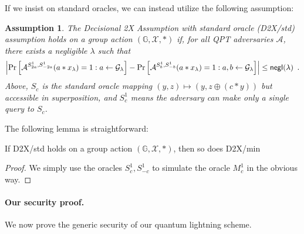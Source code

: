 \documentclass{article}\usepackage[a4paper,margin=20mm]{geometry}
\newtheorem{assumption}[theorem]{Assumption}
\numberwithin{theorem}{section}
\numberwithin{equation}{section}
\newcommand{\G}{\mathbb{G}}
\newcommand{\As}{{\mathcal{A}}}
\newcommand{\Gs}{{\mathcal{G}}}
\newcommand{\Xs}{{\mathcal{X}}}
\newcommand{\negl}{{\sf negl}}
\begin{document}
\noindent If we insist on standard oracles, we can instead utilize the following assumption:
\begin{assumption}\label{def:D2X/std} The Decisional 2X Assumption with standard oracle (D2X/std) assumption holds on a group action $(\G,\Xs,*)$ if, for all QPT adversaries $\As$, there exists a negligible $\lambda$ such that 
	\[\left|\Pr\left[\As^{S_{2a}^1,S_{-2a}^1}(a*x_\lambda)=1: a\gets\Gs_\lambda\right]-\Pr\left[\As^{S_b^1,S_{-b}^1}(a*x_\lambda)=1: a,b\gets\Gs_\lambda\right]\right|\leq\negl(\lambda)\enspace .\]
	Above, $S_{c}$ is the standard oracle mapping $(y,z)\mapsto (y,z\oplus (c*y))$ but accessible in superposition, and $S_{c}^1$ means the adversary can make only a single query to $S_c$.
\end{assumption}
\noindent The following lemma is straightforward:
\begin{lemma}\label{lem:standard2min2dx} If D2X/std holds on a group action $(\G,\Xs,*)$, then so does D2X/min
\end{lemma}
\begin{proof}We simply use the oracles $S_c^1,S_{-c}^1$ to simulate the oracle $M_c^1$ in the obvious way.
\end{proof}


\paragraph{Our security proof.} We now prove the generic security of our quantum lightning scheme.
\end{document}
